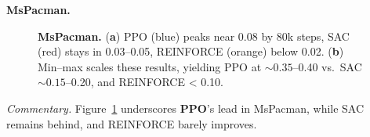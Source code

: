 \noindent \textbf{MsPacman.}
\begin{figure} 
	\centering
	\quad
	\caption{\textbf{MsPacman.}
		(\textbf{a}) PPO (blue) peaks near 0.08 by 80k steps, SAC (red) stays in 0.03--0.05, REINFORCE (orange) below 0.02.
		(\textbf{b}) Min--max scales these results, yielding PPO at \(\sim0.35\)--0.40 vs.\ SAC \(\sim0.15\)--0.20, and REINFORCE < 0.10.}
	\label{fig:mspacman_combined}
\end{figure}

\noindent
\emph{Commentary.} Figure~\ref{fig:mspacman_combined} underscores \textbf{PPO}’s lead in MsPacman, while SAC remains behind, and REINFORCE barely improves.

\medskip

